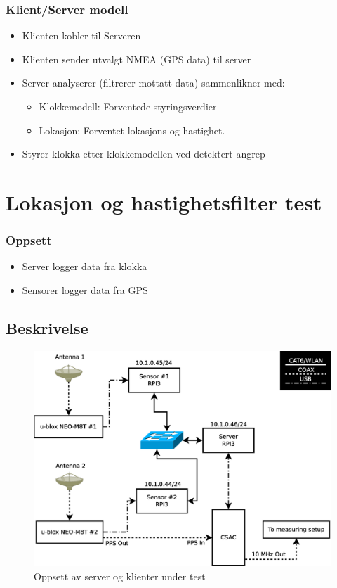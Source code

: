 \documentclass[xcolor=table]{beamer}
\begin{document}
\begin{frame}
\frametitle{Klient/Server modell}
  \begin{itemize}
    \item Klienten kobler til Serveren
    \item Klienten sender utvalgt NMEA (GPS data) til server
    \item Server analyserer (filtrerer mottatt data) sammenlikner med:
    \begin{itemize}
      \item Klokkemodell: Forventede styringsverdier
      \item Lokasjon: Forventet lokasjons og hastighet.   
    \end{itemize}
    \item Styrer klokka etter klokkemodellen ved detektert angrep
  \end{itemize}
\end{frame}

\section{Lokasjon og hastighetsfilter test}
\begin{frame}
\frametitle{Oppsett}
  \begin{itemize}
    \item Server logger data fra klokka
    \item Sensorer logger data fra GPS
  \end{itemize}
  \subsection{Beskrivelse}
      \begin{figure}
        \includegraphics[scale=0.25]{thesis/graphics/server_layout.eps}
        \caption{Oppsett av server og klienter under test}
      \end{figure}
\end{frame}
\end{document}
